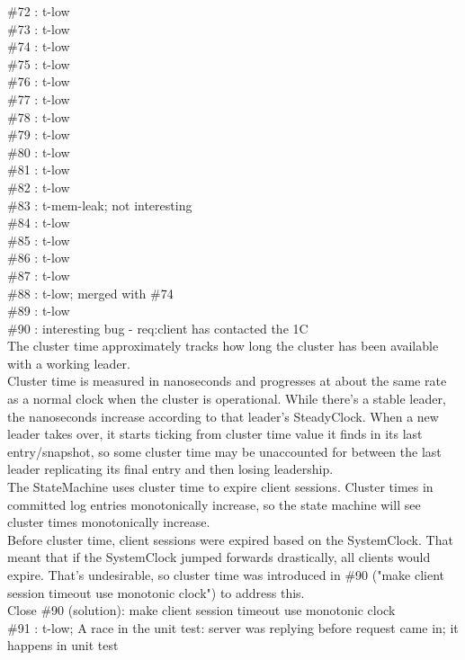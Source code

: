 \#72 : t-low\\
\#73 : t-low\\
\#74 : t-low\\
\#75 : t-low\\
\#76 : t-low\\
\#77 : t-low\\
\#78 : t-low\\
\#79 : t-low\\
\#80 : t-low\\
\#81 : t-low\\
\#82 : t-low\\
\#83 : t-mem-leak; not interesting\\
\#84 : t-low\\
\#85 : t-low\\
\#86 : t-low\\
\#87 : t-low\\
\#88 : t-low; merged with \#74\\
\#89 : t-low\\
\#90 : interesting bug - req:client has contacted the 1C\\
The cluster time approximately tracks how long the cluster has been
available with a working leader.\\
Cluster time is measured in nanoseconds and progresses at about the same
rate as a normal clock when the cluster is operational. While there's a
stable leader, the nanoseconds increase according to that leader's
SteadyClock. When a new leader takes over, it starts ticking from cluster
time value it finds in its last entry/snapshot, so some cluster time may be
unaccounted for between the last leader replicating its final entry and then
losing leadership.\\
The StateMachine uses cluster time to expire client sessions. Cluster times
in committed log entries monotonically increase, so the state machine will
see cluster times monotonically increase.\\
Before cluster time, client sessions were expired based on the SystemClock.
That meant that if the SystemClock jumped forwards drastically, all clients
would expire. That's undesirable, so cluster time was introduced in \#90
("make client session timeout use monotonic clock") to address this.\\
Close \#90 (solution): make client session timeout use monotonic clock\\
\#91 : t-low; A race in the unit test: server was replying before request came in; 
it happens in unit test\\
